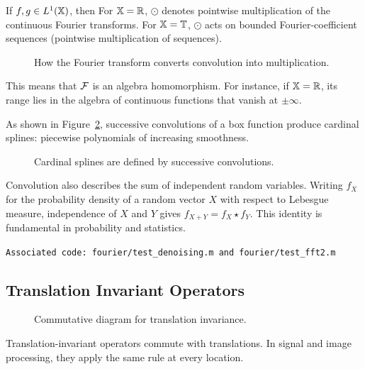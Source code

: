 \begin{prop}
If $f,g\in L^1(\mathbb{X})$, then
For $\mathbb{X}=\mathbb{R}$, $\odot$ denotes pointwise multiplication of the continuous Fourier transforms.
For $\mathbb{X}=\mathbb{T}$, $\odot$ acts on bounded Fourier-coefficient sequences (pointwise multiplication of sequences).
\end{prop}


\begin{figure}[tbp]
\centering
{}
\caption{How the Fourier transform converts convolution into multiplication.}
\label{fig-review-fourier-convolution-fourier}
\end{figure}
This means that $\mathcal{F}$ is an algebra homomorphism. For instance, if $\mathbb{X}=\mathbb{R}$, its range lies in the algebra of continuous functions that vanish at $\pm\infty$.

As shown in Figure~\ref{fig-splines}, successive convolutions of a box function produce cardinal splines: piecewise polynomials of increasing smoothness.

\begin{figure}[tbp]
\centering
{}
\caption{Cardinal splines are defined by successive convolutions.}
\label{fig-splines}
\end{figure}


Convolution also describes the sum of independent random variables. Writing $f_X$ for the probability density of a random vector $X$ with respect to Lebesgue measure, independence of $X$ and $Y$ gives $f_{X+Y}=f_X \star f_Y$. This identity is fundamental in probability and statistics.


\texttt{Associated code: fourier/test\_denoising.m and fourier/test\_fft2.m}

\subsection{Translation Invariant Operators}

\begin{figure}[tbp]
\centering
{}
\caption{Commutative diagram for translation invariance.}
\label{fig-review-fourier-translation-inv}
\end{figure}
Translation-invariant operators commute with translations. In signal and image processing, they apply the same rule at every location.

